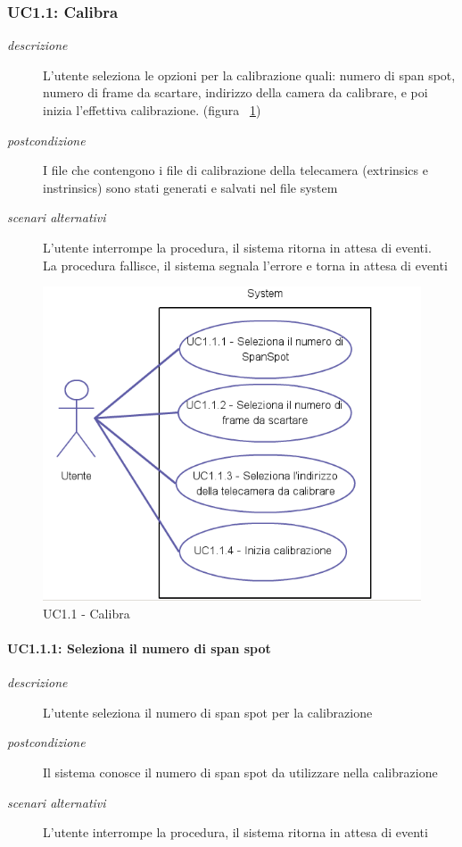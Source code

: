 \subsubsection{UC1.1: Calibra}
\begin{description}
 \item[\em{descrizione}] L'utente seleziona le opzioni per la calibrazione quali: numero di span spot, numero di frame da scartare, indirizzo della camera da calibrare, e poi inizia l'effettiva calibrazione.  (figura ~\ref{fig:uc1.1})
 \item[\em{postcondizione}] I file che contengono i file di
  calibrazione della telecamera (extrinsics e instrinsics) sono stati generati e salvati nel file system
  \item[\em{scenari alternativi}] L'utente interrompe la procedura, il sistema ritorna in attesa di eventi. \\
  La procedura fallisce, il sistema segnala l'errore e torna in attesa di eventi
 \end{description}
\begin{figure}[htpb]
\centering
\includegraphics[scale=0.4]{./images/uc11.png}
\caption{UC1.1 - Calibra}
\label{fig:uc1.1}
\end{figure} 

\paragraph{UC1.1.1: Seleziona il numero di span spot}
\begin{description}
 \item[\em{descrizione}] L'utente seleziona il numero di span spot per la calibrazione
 \item[\em{postcondizione}] Il sistema conosce il numero di span spot da utilizzare nella calibrazione
  \item[\em{scenari alternativi}] L'utente interrompe la procedura, il sistema ritorna in attesa di eventi
 \end{description}

